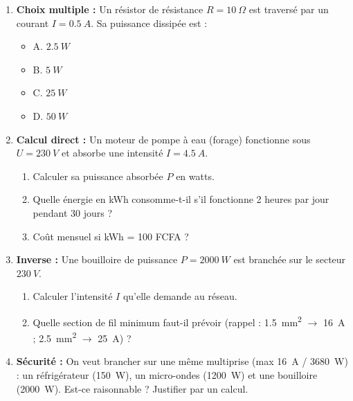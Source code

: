 \documentclass[11pt]{article}
\begin{document}
\begin{exercice}
\begin{enumerate}
\item \textbf{Choix multiple :} Un résistor de résistance $R = \SI{10}{\Omega}$ est traversé par un courant $I = \SI{0,5}{A}$. Sa puissance dissipée est :
\begin{itemize}
\item A. $\SI{2,5}{W}$ \item B. $\SI{5}{W}$ \item C. $\SI{25}{W}$ \item D. $\SI{50}{W}$
\end{itemize}
\item \textbf{Calcul direct :} Un moteur de pompe à eau (forage) fonctionne sous $U = \SI{230}{V}$ et absorbe une intensité $I = \SI{4,5}{A}$.
\begin{enumerate}
\item Calculer sa puissance absorbée $P$ en watts.
\item Quelle énergie en kWh consomme-t-il s'il fonctionne 2 heures par jour pendant 30 jours ?
\item Coût mensuel si kWh = 100 FCFA ?
\end{enumerate}
\item \textbf{Inverse :} Une bouilloire de puissance $P = \SI{2000}{W}$ est branchée sur le secteur $\SI{230}{V}$.
\begin{enumerate}
\item Calculer l'intensité $I$ qu'elle demande au réseau.
\item Quelle section de fil minimum faut-il prévoir (rappel : \SI{1,5}{mm^2} $\to$ \SI{16}{A} ; \SI{2,5}{mm^2} $\to$ \SI{25}{A}) ?
\end{enumerate}
\item \textbf{Sécurité :} On veut brancher sur une même multiprise (max \SI{16}{A} / \SI{3680}{W}) : un réfrigérateur (\SI{150}{W}), un micro-ondes (\SI{1200}{W}) et une bouilloire (\SI{2000}{W}). Est-ce raisonnable ? Justifier par un calcul.
\end{enumerate}
\end{exercice}
\end{document}
